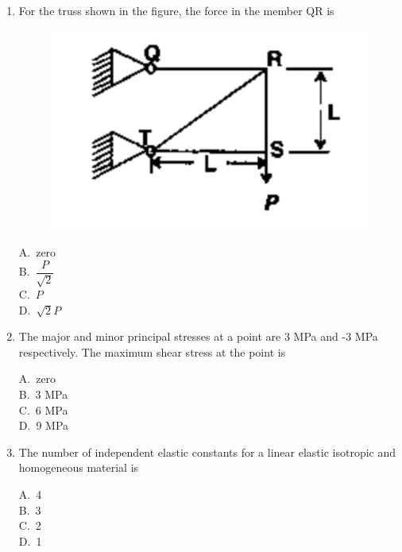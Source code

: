 \documentclass[journal,12pt,onecolumn]{IEEEtran}
\theoremstyle{remark}
\begin{document}
\begin{enumerate}
\noindent\item For the truss shown in the figure, the force in the member QR is \hfill{}
\begin{figure}[H]
    \centering
    \includegraphics[scale=0.5]{figs/image1.jpg}
    \caption{}
    \label{fig:figure1}
\end{figure}
\begin{multicols}{4}
A.\ zero \\
B.\ $\dfrac{P}{\sqrt{2}}$ \\
C.\ $P$ \\
D.\ $\sqrt{2}P$
\end{multicols}

\noindent\item The major and minor principal stresses at a point are 3 MPa and -3 MPa respectively. The maximum shear stress at the point is \hfill{}
\begin{multicols}{4}
A.\ zero \\
B.\ 3 MPa \\
C.\ 6 MPa \\
D.\ 9 MPa
\end{multicols}

\noindent\item  The number of independent elastic constants for a linear elastic isotropic and homogeneous material is \hfill{}
\begin{multicols}{4}
A.\ 4 \\
B.\ 3 \\
C.\ 2 \\
D.\ 1
\end{multicols}


\end{enumerate}
\end{document}
